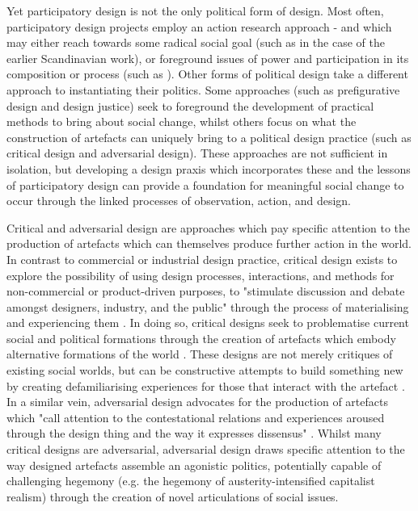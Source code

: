 Yet participatory design is not the only political form of design. Most often, participatory design projects employ an action research approach - and which may either reach towards some radical social goal (such as in the case of the earlier Scandinavian work), or foreground issues of power and participation in its composition or process (such as \citet{vines_configuring_2013}). Other forms of political design take a different approach to instantiating their politics. Some approaches (such as prefigurative design and design justice) seek to foreground the development of practical methods to bring about social change, whilst others focus on what the construction of artefacts can uniquely bring to a political design practice (such as critical design and adversarial design).  These approaches are not sufficient in isolation, but developing a design praxis which incorporates these and the lessons of participatory design can provide a foundation for meaningful social change to occur through the linked processes of observation, action, and design.   

Critical and adversarial design are approaches which pay specific attention to the production of artefacts which can themselves produce further action in the world. In contrast to commercial or industrial design practice, critical design exists to explore the possibility of using design processes, interactions, and methods for non-commercial or product-driven purposes, to "stimulate discussion and debate amongst designers, industry, and the public"  \citep[58]{dunne_design_2001} through the process of materialising and experiencing them \citep{malpass_critical_2019}. In doing so, critical designs seek to problematise current social and political formations through the creation of artefacts which embody alternative formations of the world \citep{bardzell_reading_2014}. These designs are not merely critiques of existing social worlds, but can be constructive attempts to build something new by creating defamiliarising experiences for those that interact with the artefact \citep{blythe_imaginary_2018}. In a similar vein, adversarial design advocates for the production of artefacts which "call attention to the contestational relations and experiences aroused through the design thing and the way it expresses dissensus" \citep{disalvo_adversarial_2012}. Whilst many critical designs are adversarial, adversarial design draws specific attention to the way designed artefacts assemble an agonistic politics, potentially capable of challenging hegemony (e.g. the hegemony of austerity-intensified capitalist realism) through the creation of novel articulations of social issues. 

